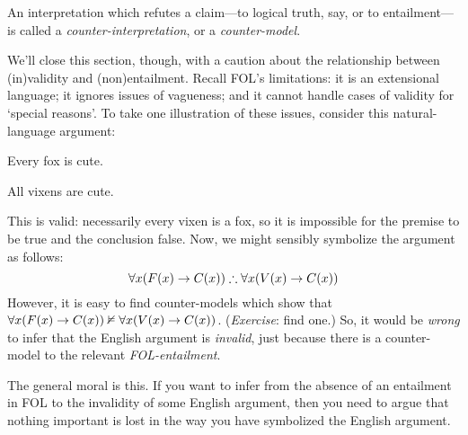 An interpretation which refutes a claim---to logical truth, say, or to entailment---is called a \emph{counter-interpretation}, or a \emph{counter-model}.

We'll close this section, though, with a caution about the relationship between (in)validity and (non)entailment. Recall FOL's limitations: it is an extensional language; it ignores issues of vagueness; and it cannot handle cases of validity for `special reasons'. To take one illustration of these issues, consider this natural-language argument: 
\begin{earg}
	\item[] Every fox is cute.
	\item[\texttherefore] All vixens are cute.
\end{earg}
This is valid: necessarily every vixen is a fox, so it is impossible for the premise to be true and the conclusion false. Now, we might sensibly symbolize the argument as follows:
$$\forall x(\atom{F}{x} \eif \atom{C}{x}) \therefore \forall x(\atom{V}{x} \eif  \atom{C}{x})$$
However, it is easy to find counter-models which show that $\forall x(\mathord{F}(x) \rightarrow \mathord{C}(x)) \nvDash \forall x(\mathord{V}(x) \rightarrow  \mathord{C}(x))$. (\emph{Exercise}: find one.) So, it would be \emph{wrong} to infer that the English argument is \emph{invalid}, just because there is a counter-model to the relevant \emph{FOL{}-entailment}.

The general moral is this. If you want to infer from the absence of an entailment in FOL to the invalidity of some English argument, then you need to argue that nothing important is lost in the way you have symbolized the English argument.

\practiceproblems


